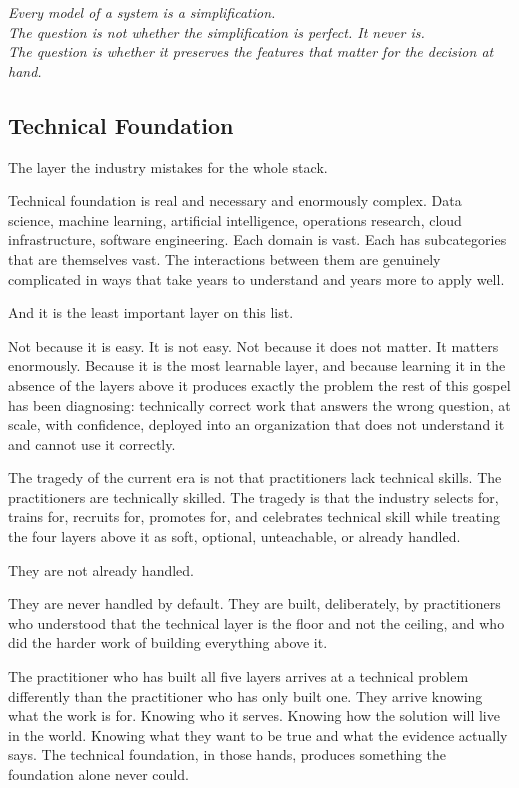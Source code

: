 \begin{center}\small\itshape
  Every model of a system is a simplification.\\
  The question is not whether the simplification is perfect. It never is.\\
  The question is whether it preserves the features that matter for the decision at hand.
\end{center}

\subsection*{Technical Foundation}

The layer the industry mistakes for the whole stack.

Technical foundation is real and necessary and enormously complex. Data science, machine learning, artificial intelligence, operations research, cloud infrastructure, software engineering. Each domain is vast. Each has subcategories that are themselves vast. The interactions between them are genuinely complicated in ways that take years to understand and years more to apply well.

And it is the least important layer on this list.

Not because it is easy. It is not easy. Not because it does not matter. It matters enormously. Because it is the most learnable layer, and because learning it in the absence of the layers above it produces exactly the problem the rest of this gospel has been diagnosing: technically correct work that answers the wrong question, at scale, with confidence, deployed into an organization that does not understand it and cannot use it correctly.

The tragedy of the current era is not that practitioners lack technical skills. The practitioners are technically skilled. The tragedy is that the industry selects for, trains for, recruits for, promotes for, and celebrates technical skill while treating the four layers above it as soft, optional, unteachable, or already handled.

They are not already handled.

They are never handled by default. They are built, deliberately, by practitioners who understood that the technical layer is the floor and not the ceiling, and who did the harder work of building everything above it.

The practitioner who has built all five layers arrives at a technical problem differently than the practitioner who has only built one. They arrive knowing what the work is for. Knowing who it serves. Knowing how the solution will live in the world. Knowing what they want to be true and what the evidence actually says. The technical foundation, in those hands, produces something the foundation alone never could.

